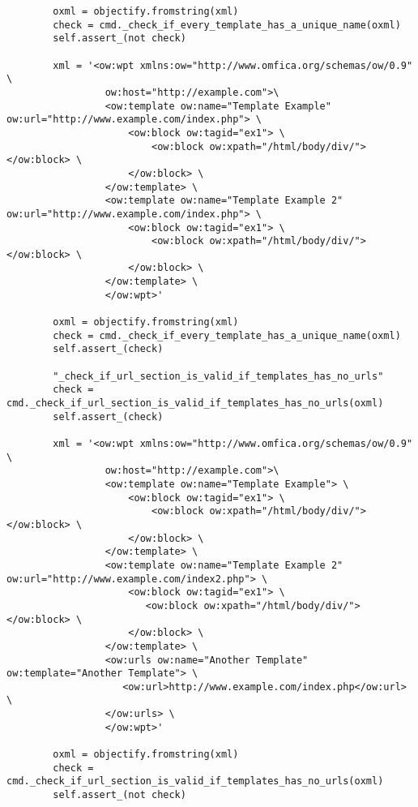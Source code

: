 \begin{lstlisting}
        oxml = objectify.fromstring(xml)
        check = cmd._check_if_every_template_has_a_unique_name(oxml)
        self.assert_(not check)

        xml = '<ow:wpt xmlns:ow="http://www.omfica.org/schemas/ow/0.9" \
                 ow:host="http://example.com">\
                 <ow:template ow:name="Template Example" ow:url="http://www.example.com/index.php"> \
                     <ow:block ow:tagid="ex1"> \
                         <ow:block ow:xpath="/html/body/div/"></ow:block> \
                     </ow:block> \
                 </ow:template> \
                 <ow:template ow:name="Template Example 2" ow:url="http://www.example.com/index.php"> \
                     <ow:block ow:tagid="ex1"> \
                         <ow:block ow:xpath="/html/body/div/"></ow:block> \
                     </ow:block> \
                 </ow:template> \
                 </ow:wpt>'

        oxml = objectify.fromstring(xml)
        check = cmd._check_if_every_template_has_a_unique_name(oxml)
        self.assert_(check)

        "_check_if_url_section_is_valid_if_templates_has_no_urls"
        check = cmd._check_if_url_section_is_valid_if_templates_has_no_urls(oxml)
        self.assert_(check)

        xml = '<ow:wpt xmlns:ow="http://www.omfica.org/schemas/ow/0.9" \
                 ow:host="http://example.com">\
                 <ow:template ow:name="Template Example"> \
                     <ow:block ow:tagid="ex1"> \
                         <ow:block ow:xpath="/html/body/div/"></ow:block> \
                     </ow:block> \
                 </ow:template> \
                 <ow:template ow:name="Template Example 2" ow:url="http://www.example.com/index2.php"> \
                     <ow:block ow:tagid="ex1"> \
                        <ow:block ow:xpath="/html/body/div/"></ow:block> \
                     </ow:block> \
                 </ow:template> \
                 <ow:urls ow:name="Another Template" ow:template="Another Template"> \
                    <ow:url>http://www.example.com/index.php</ow:url> \
                 </ow:urls> \
                 </ow:wpt>'
        
        oxml = objectify.fromstring(xml)
        check = cmd._check_if_url_section_is_valid_if_templates_has_no_urls(oxml)
        self.assert_(not check)


\end{lstlisting}
